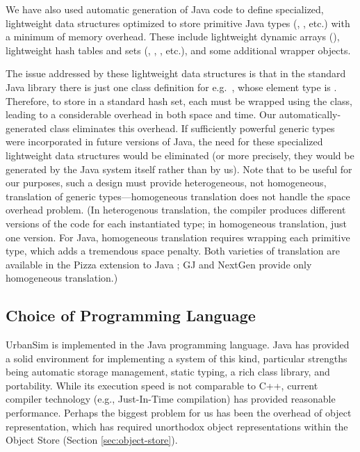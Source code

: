 We have also used automatic generation of Java code to define specialized,
lightweight data structures optimized to store primitive Java types
(, , etc.) with a minimum of memory overhead.
These include lightweight dynamic arrays (),
lightweight hash tables and sets (,
, , etc.), and some additional
wrapper objects.

The issue addressed by these lightweight data structures is that in the
standard Java library there is just one class definition for e.g.\
, whose element type is .  Therefore, to
store \keyw{ints} in a standard hash set, each \keyw{int} must be wrapped
using the \varnm{Integer} class, leading to a considerable overhead in
both space and time.  Our automatically-generated \varnm{HashSetInt} class
eliminates this overhead.  If sufficiently powerful generic types were
incorporated in future versions of Java, the need for these specialized
lightweight data structures would be eliminated (or more precisely, they
would be generated by the Java system itself rather than by us).
Note that to be useful for our purposes, such a design must provide
heterogeneous, not homogeneous, translation of generic types---homogeneous
translation does not handle the space overhead problem.  (In heterogenous
translation, the compiler produces different versions of the code for each
instantiated type; in homogeneous translation, just one version.  For Java,
homogeneous translation requires wrapping each primitive type, which
adds a tremendous space penalty.  Both varieties of
translation are available in the Pizza extension to Java
\citep{odersky-popl-1997}; GJ \citep{bracha-oopsla-1998} and NextGen
\citep{cartwright-oopsla-1998} provide only homogeneous translation.)


\subsection{Choice of Programming Language}

UrbanSim is implemented in the Java programming language.
Java has provided a solid environment for implementing a system of this
kind, particular strengths being automatic storage management, static
typing, a rich class library, and portability.  While its execution speed
is not comparable to C++, current compiler technology (e.g., Just-In-Time
compilation) has provided reasonable performance.  Perhaps the biggest
problem for us has been the overhead of object representation, which has
required unorthodox object representations within the Object Store (Section
\ref{sec:object-store}).

